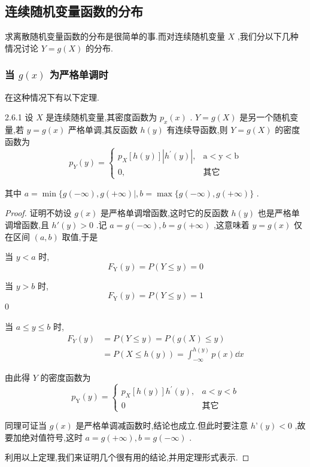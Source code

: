 \subsection{连续随机变量函数的分布}\label{ssec:2.6.2}

求离散随机变量函数的分布是很简单的事.而对连续随机变量 $ X $ ,我们分以下几种情况讨论 $ Y=g(X) $ 的分布.

\subsubsection{当 $ g(x) $ 为严格单调时}

在这种情况下有以下定理.

\begin{theorem}{}{2.6.1}
	设 $ X $ 是连续随机变量,其密度函数为 $ p_{x}(x) $ . $ Y=g(X) $ 是另一个随机变量,若 $ y=g(x) $ 严格单调,其反函数 $ h(y) $ 有连续导函数,则 $ Y=g(X) $ 的密度函数为
	\begin{equation}
	p_{Y}(y)=\left\{
	\begin{array}{ll}
	{p_{X}[h(y)]\left|h^{\prime}(y)\right|,} & { \mathrm{a}<\mathrm{y}<\mathrm{b}} \\ 
	{0,} & {\text{其它}}
	\end{array}\right. \label{eq:2.6.1}
	\end{equation}
	
	其中 $ a=\min \{g(-\infty), g(+\infty) |, b=\max \{g(-\infty), g(+\infty)\} $ .
\end{theorem}

\begin{proof}
	证明不妨设 $ g(x) $ 是严格单调增函数,这时它的反函数 $ h(y) $ 也是严格单调增函数,且 $ h'(y)>0 $ .记 $ a=g(-\infty), b=g(+\infty) $ ,这意味着 $ y=g(x) $ 仅在区间 $ (a,b) $ 取值,于是
	
	当 $ y<a $ 时,
	\[
	F_{\mathrm{Y}}(y)=P(Y \leqslant y)=0
	\]
	
	当 $ y>b $ 时,
	\[
	F_{\mathrm{Y}}(y)=P(Y \leqslant y)=1
	\]0
	
	当 $ a \leqslant y \leqslant b $ 时,
	\[
	\begin{aligned} F_{Y}(y) &=P(Y \leqslant y)=P(g(X) \leqslant y) \\ &=P(X \leqslant h(y))=\int_{-\infty}^{h(y)} p(x) \dd x \end{aligned}
	\]
	
	由此得 $ Y $ 的密度函数为
	\[
	p_{\mathrm{Y}}(y)=\left\{
	\begin{array}{ll}
	{p_{X}[h(y)] h^{\prime}(y), } & {a<y<b} \\ 
	{0} & {\text{其它}}
	\end{array}\right.
	\]
	
	同理可证当 $ g(x) $ 是严格单调减函数时,结论也成立.但此时要注意 $ h’(y)<0 $ ,故要加绝对值符号,这时 $ a=g(+\infty), b=g(-\infty) $ .
	
	利用以上定理,我们来证明几个很有用的结论,并用定理形式表示.
\end{proof}

